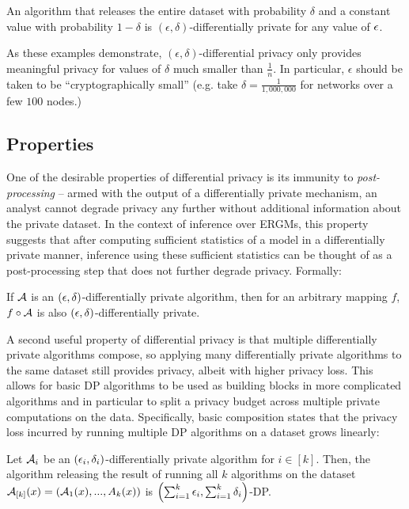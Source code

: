 \begin{example}
	\label{ex:bad_delta2}
	An algorithm that releases the entire dataset with probability $\delta$ and a constant value with probability $1-\delta$ is $(\epsilon, \delta)$-differentially private for any value of $\epsilon$.
\end{example}
As these examples demonstrate, $(\epsilon, \delta)$-differential privacy only provides meaningful privacy for values of $\delta$ much smaller than $\frac{1}{n}$. In particular, $\epsilon$ should be taken to be ``cryptographically small'' (e.g.  take $\delta = \frac{1}{1,000,000}$ for networks over a few $100$ nodes.)

\subsection*{Properties}

One of the desirable properties of differential privacy is its immunity to \emph{post-processing} -- armed with the output of a differentially private mechanism, an analyst cannot degrade privacy any further without additional information about the private dataset. In the context of inference over ERGMs, this property suggests that after computing sufficient statistics of a model in a differentially private manner, inference using these sufficient statistics can be thought of as a post-processing step that does not further degrade privacy. Formally: 
	\begin{property}
		If $\mathcal{A}$ is an $(\epsilon, \delta)$-differentially private algorithm, then for an arbitrary mapping $f$,  $f \circ \mathcal{A}$ is also $(\epsilon, \delta)$-differentially private. 	
	\end{property}

A second useful property of differential privacy is that multiple differentially private algorithms compose, so applying many differentially private algorithms to the same dataset still provides privacy, albeit with higher privacy loss. This allows for basic DP algorithms to be used as building blocks in more complicated algorithms and in particular to split a privacy budget across multiple private computations on the data. Specifically, basic composition states that the privacy loss incurred by running multiple DP algorithms on a dataset grows linearly:
	\begin{property}
		Let $\mathcal{A}_i$ be an  $(\epsilon_i, \delta_i)$-differentially private algorithm for $i \in [k]$. Then, the algorithm releasing the result of running all $k$ algorithms on the dataset $\mathcal{A}_{[k]}(x) = (\mathcal{A}_1(x),...,A_k(x))$ is $\left(\sum_{i=1}^k \epsilon_i, \sum_{i=1}^k\delta_i\right)$-DP.
	\end{property}



